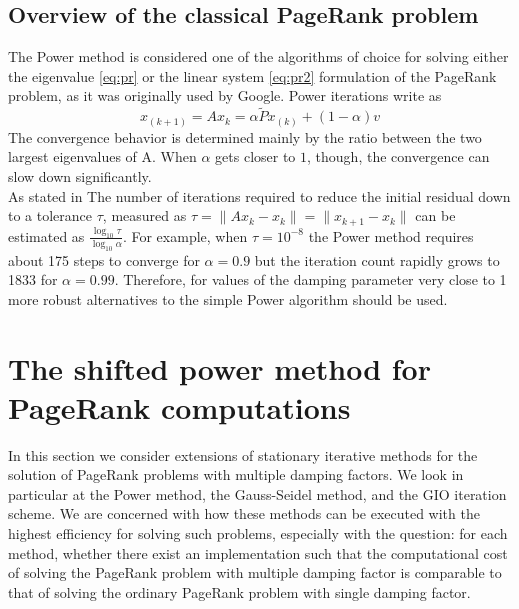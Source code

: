 \documentclass[12pt]{article}
\begin{document}
\subsection{Overview of the classical PageRank problem}
The Power method is considered one of the algorithms of choice for solving either the eigenvalue \ref{eq:pr} or the linear system \ref{eq:pr2} formulation of the PageRank problem, as it was originally used by Google. Power iterations write as
\begin{equation}\label{eq:power}
    x_{(k+1)} = Ax_k =\alpha \tilde P x_{(k)} + (1 - \alpha)v
\end{equation}
The convergence behavior is determined mainly by the ratio between the two largest eigenvalues of A. When $\alpha$ gets closer to $1$, though, the convergence can slow down significantly. \\

\noindent As stated in \cite{SHEN2022126799} The number of iterations required to reduce the initial residual down to a tolerance $\tau$, measured as $\tau = \lVert Ax_k - x_k \rVert = \lVert x_{k+1} - x_k \rVert$ can be estimated as $\frac{\log_10 \tau}{\log_10 \alpha}$. For example, when $\tau = 10^{-8}$ the Power method requires about 175 steps to converge for $\alpha = 0.9$ but the iteration count rapidly grows to 1833 for $\alpha = 0.99$. Therefore, for values of the damping parameter very close to 1 more robust alternatives to the simple Power algorithm should be used.

\section{The shifted power method for PageRank computations}
In this section we consider extensions of stationary iterative methods for the solution of PageRank problems with multiple damping factors. We look in particular at the Power method, the Gauss-Seidel method, and the GIO iteration scheme. We are concerned with how these methods can be executed with the highest efficiency for solving such problems, especially with the question: for each method, whether there exist an implementation such that the computational cost of solving the PageRank problem with multiple damping factor is comparable to that of solving the ordinary PageRank problem with single damping factor.
\end{document}
